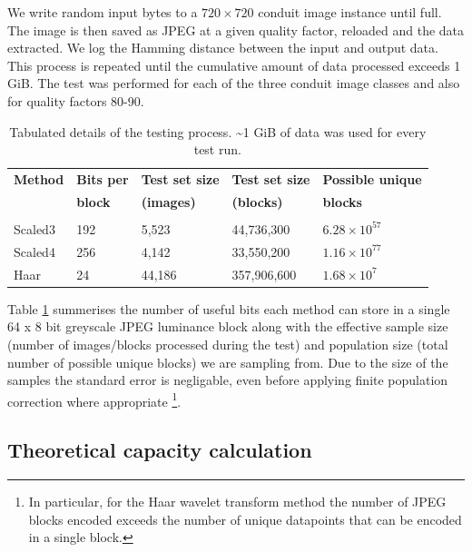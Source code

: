 We write random input bytes to a $720 \times 720$ conduit image instance until full. The image is then saved as JPEG at a given quality factor, reloaded and the data extracted. We log the Hamming distance between the input and output data. This process is repeated until the cumulative amount of data processed exceeds 1 GiB. The test was performed for each of the three conduit image classes and also for quality factors 80-90.

\begin{table}[tbph]
  \begin{center}
        \begin{tabular}{l l l l l}
        \textbf{Method} &\textbf{Bits per} &\textbf{Test set size} & \textbf{Test set size} &\textbf{Possible unique} \\ 
            &\textbf{block} &\textbf{(images)} &\textbf{(blocks)} &\textbf{blocks} \\ [0.1ex] \hline \\ [-1.5ex]
        Scaled3	&192	&5,523	&44,736,300	& $6.28 \times 10^{57}$ \\
        Scaled4	&256	&4,142	&33,550,200	& $1.16 \times 10^{77}$ \\
        Haar	&24	&44,186	&357,906,600	& $1.68 \times 10^{7}$ \\
        \end{tabular}
        \caption{Tabulated details of the testing process. \textasciitilde 1 GiB of data was used for every test run.}
        \label{tab:img-test}
    \end{center}
\end{table}

Table \ref{tab:img-test} summerises the number of useful bits each method can store in a single 64 x 8 bit greyscale JPEG luminance block along with the effective sample size (number of images/blocks processed during the test) and population size (total number of possible unique blocks) we are sampling from. Due to the size of the samples the standard error is negligable, even before applying finite population correction where appropriate \footnote{In particular, for the Haar wavelet transform method the number of JPEG blocks encoded exceeds the number of unique datapoints that can be encoded in a single block.}. 

\subsection{Theoretical capacity calculation}

